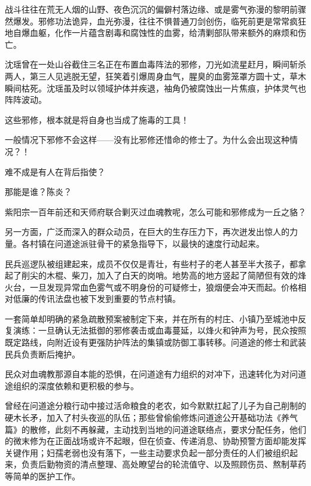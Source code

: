 战斗往往在荒无人烟的山野、夜色沉沉的偏僻村落边缘、或是雾气弥漫的黎明前骤然爆发。邪修功法诡异，血光弥漫，往往不惧普通刀剑创伤，临死前更是常常疯狂地自爆血躯，化作一片蕴含剧毒和腐蚀性的血雾，给清剿部队带来额外的麻烦和伤亡。

沈瑶曾在一处山谷截住三名正在布置血毒阵法的邪修，刀光如流星赶月，瞬间斩杀两人，第三人见逃脱无望，狂笑着引爆周身血气，腥臭的血雾笼罩方圆十丈，草木瞬间枯死。沈瑶虽及时以领域护体并疾退，袖角仍被腐蚀出一片焦痕，护体灵气也阵阵波动。

\vspace{2em}

这些邪修，根本就是将自身也当成了施毒的工具！

\vspace{2em}

一般情况下邪修不会这样——没有比邪修还惜命的修士了。为什么会出现这种情况？！

难不成是有人在背后指使？

那能是谁？陈炎？

紫阳宗一百年前还和天师府联合剿灭过血魂教呢，怎么可能和邪修成为一丘之貉？

\vspace{2em}

另一方面，广泛而深入的群众动员，在巨大的生存压力下，再次迸发出惊人的力量。各村镇在问道途派驻骨干的紧急指导下，以最快的速度行动起来。

民兵巡逻队被组建起来，成员不仅仅是青壮，有些村子的老人甚至半大孩子，都拿起了削尖的木棍、柴刀，加入了白天的岗哨。地势高的地方竖起了简陋但有效的烽火台，一旦发现异常血色雾气或不明身份的可疑修士，狼烟便会冲天而起。价格相对低廉的传讯法盘也被下发到重要的节点村镇。

一套简单却明确的紧急疏散预案被制定下来，并在所有的村庄、小镇乃至城池中反复演练：一旦确认无法抵御的邪修袭击或血毒蔓延，以烽火和钟声为号，民众按照既定路线，向附近设有更强防护阵法的集镇或防御工事转移。问道途的修士和武装民兵负责断后掩护。

民众对血魂教那源自本能的恐惧，在问道途有力组织的对冲下，迅速转化为对问道途组织的深度依赖和更积极的参与。

曾经在问道途分粮行动中接过活命粮食的老农，如今默默扛起了儿子为自己削制的硬木长矛，加入了村头夜巡的队伍；那些曾偷偷修炼问道途公开基础功法《养气篇》的散修，此刻不再躲藏，主动找到当地的问道途联络点，要求分配任务，他们的微末修为在正面战场或许不起眼，但在侦查、传递消息、协助预警方面却能发挥关键作用；妇孺老弱也没有落下，一些主动要求负起一部分责任的人们被组织起来，负责后勤物资的清点整理、高处瞭望台的轮流值守、以及照顾伤员、熬制草药等简单的医护工作。

